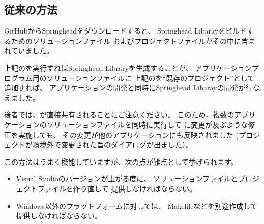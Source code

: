 
\subsection{従来の方法}
\label{subsec:WhatCMakeWillDoConventionalMethod}

GitHubからSpringheadをダウンロードすると、
Springhead Libarayをビルドするためのソリューションファイル
およびプロジェクトファイルがその中に含まれていました。

\medskip
\begin{narrow}
    \begin{narrow}\begin{minipage}{\textwidth}
	\medskip
  \end{minipage}\end{narrow}
\end{narrow}

上記の\SolutionFile を実行すればSpringhead Libraryを生成することが、
アプリケーションプログラム用のソリューションファイルに
上記の\ProjectFile を``既存のプロジェクト''として追加すれば、
アプリケーションの開発と同時にSpringhead Libarayの開発が行なえました。

後者では、\ProjectFile が直接共有されることにご注意ください。
このため、複数のアプリケーションのソリューションファイルを同時に実行して
\ProjectFile に変更が及ぶような修正を実施しても、
その変更が他のアプリケーションにも反映されました
(プロジェクトが環境外で変更された旨のダイアログが出ました）。

\medskip
この方法はうまく機能していますが、次の点が難点として挙げられます。
\begin{itemize}
  \item	Visual Studioのバージョンが上がる度に、
	ソリューションファイルとプロジェクトファイルを作り直して
	提供しなければならない。
  \item	Windows以外のプラットフォームに対しては、
	Makefileなどを別途作成して提供しなければならない。
\end{itemize}

